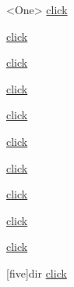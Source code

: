 \Target<One>
\hyperlink{one}{click}

\hyperlink{two}{click}

\hyperlink{three}{click}

\Target{}
\hyperlink{duma four}{click}

\Target{}
\hyperlink{variable}{click}

\Target{}
\hyperlink{funame()}{click}

\Target{}
\hyperlink{klassz}{click}

\Target{}
\hyperlink{template}{click}

\Target{}
\hyperlink{make target}{click}

\Target{}
\hyperlink{file}{click}

\Target{}[five]{dir}
\hyperlink{five}{click}
